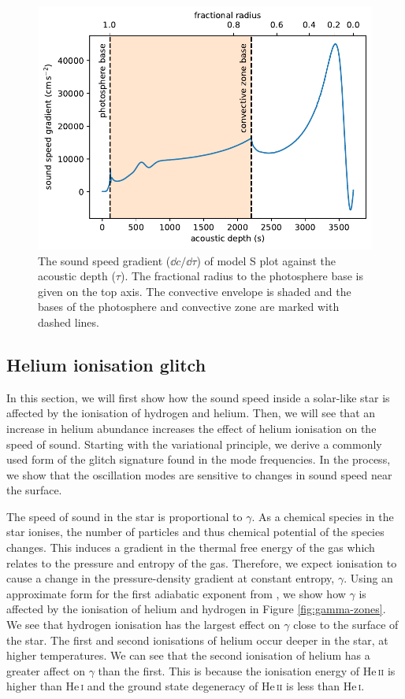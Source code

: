 \begin{figure}
    \centering
    \includegraphics{figures/sound-speed-gradient.pdf}
    \caption{The sound speed gradient (\(\dd c/\dd \tau\)) of model S plot against the acoustic depth (\(\tau\)). The fractional radius to the photosphere base is given on the top axis. The convective envelope is shaded and the bases of the photosphere and convective zone are marked with dashed lines.}
    \label{fig:sound-speed-gradient}
\end{figure}

\subsection{Helium ionisation glitch}\label{sec:helium-glitch}

In this section, we will first show how the sound speed inside a solar-like star is affected by the ionisation of hydrogen and helium. Then, we will see that an increase in helium abundance increases the effect of helium ionisation on the speed of sound. Starting with the variational principle, we derive a commonly used form of the glitch signature found in the mode frequencies. In the process, we show that the oscillation modes are sensitive to changes in sound speed near the surface.

The speed of sound in the star is proportional to \(\gamma\). As a chemical species in the star ionises, the number of particles and thus chemical potential of the species changes. This induces a gradient in the thermal free energy of the gas which relates to the pressure and entropy of the gas. Therefore, we expect ionisation to cause a change in the pressure-density gradient at constant entropy, \(\gamma\). Using an approximate form for the first adiabatic exponent from \citet{Houdayer.Reese.ea2021}, we show how \(\gamma\) is affected by the ionisation of helium and hydrogen in Figure \ref{fig:gamma-zones}. We see that hydrogen ionisation has the largest effect on \(\gamma\) close to the surface of the star. The first and second ionisations of helium occur deeper in the star, at higher temperatures. We can see that the second ionisation of helium has a greater affect on \(\gamma\) than the first. This is because the ionisation energy of He\,\textsc{ii} is higher than He\,\textsc{i} and the ground state degeneracy of He\,\textsc{ii} is less than He\,\textsc{i}.

